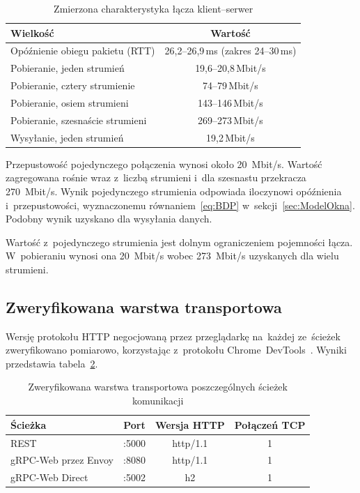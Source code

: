 \begin{table}[htb]
\centering
\footnotesize
\caption{Zmierzona charakterystyka łącza klient--serwer}
\label{tab:CharakterystykaLacza}
\begin{tabular}{|l|c|}
\hline
\textbf{Wielkość} & \textbf{Wartość} \\
\hline
Opóźnienie obiegu pakietu (RTT) & 26,2--26,9\,ms (zakres 24--30\,ms) \\
Pobieranie, jeden strumień & 19,6--20,8\,Mbit/s \\
Pobieranie, cztery strumienie & 74--79\,Mbit/s \\
Pobieranie, osiem strumieni & 143--146\,Mbit/s \\
Pobieranie, szesnaście strumieni & 269--273\,Mbit/s \\
Wysyłanie, jeden strumień & 19,2\,Mbit/s \\
\hline
\end{tabular}
\end{table}

Przepustowość pojedynczego połączenia wynosi około 20~Mbit/s. Wartość zagregowana rośnie wraz z~liczbą strumieni i~dla szesnastu przekracza 270~Mbit/s. Wynik pojedynczego strumienia odpowiada iloczynowi opóźnienia i~przepustowości, wyznaczonemu równaniem~\ref{eq:BDP} w~sekcji~\ref{sec:ModelOkna}. Podobny wynik uzyskano dla wysyłania danych.

Wartość z~pojedynczego strumienia jest dolnym ograniczeniem pojemności łącza. W~pobieraniu wynosi ona 20~Mbit/s wobec 273~Mbit/s uzyskanych dla wielu strumieni.

\subsection{Zweryfikowana warstwa transportowa}
\label{subsec:WarstwaTransportowa}

Wersję protokołu HTTP negocjowaną przez przeglądarkę na~każdej ze~ścieżek zweryfikowano pomiarowo, korzystając z~protokołu Chrome~DevTools~\cite{bib:CDP}. Wyniki przedstawia tabela~\ref{tab:WarstwaTransportowa}.

\begin{table}[htb]
\centering
\footnotesize
\caption{Zweryfikowana warstwa transportowa poszczególnych ścieżek komunikacji}
\label{tab:WarstwaTransportowa}
\begin{tabular}{|l|c|c|c|}
\hline
\textbf{Ścieżka} & \textbf{Port} & \textbf{Wersja HTTP} & \textbf{Połączeń TCP} \\
\hline
REST                & :5000 & http/1.1 & 1 \\
gRPC-Web przez Envoy & :8080 & http/1.1 & 1 \\
gRPC-Web Direct     & :5002 & h2       & 1 \\
\hline
\end{tabular}
\end{table}

